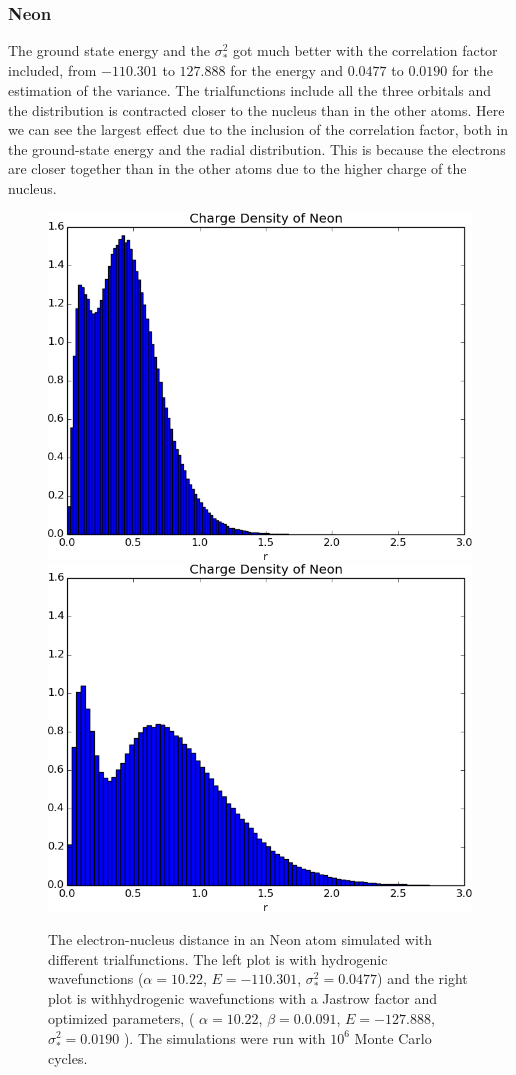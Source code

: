		
	\subsubsection{Neon}
		The ground state energy and the \(\sigma_*^2\) got much better with the correlation factor included, from \(-110.301\) to \(127.888\) for the energy and  \( 0.0477 \) to \( 0.0190 \) for the estimation of the variance. The trialfunctions include all the three orbitals and the distribution is contracted closer to the nucleus than in the other atoms. Here we can see the largest effect due to the inclusion of the correlation factor, both in the ground-state energy and the radial distribution. This is because the electrons are closer together than in the other atoms due to the higher charge of the nucleus.
		\begin{figure}
			\centering \includegraphics[width=0.45\linewidth]{../figures/used/ChargeDensityNeonSimple}
			\centering \includegraphics[width=0.45\linewidth]{../figures/used/ChargeDensityNeon}
			\protect\caption{The electron-nucleus distance in an Neon atom simulated with different trialfunctions. The left plot is with hydrogenic wavefunctions ($\alpha = 10.22$, $E = -110.301$, $\sigma^2_* = 0.0477$) and the right plot is withhydrogenic wavefunctions with a Jastrow factor and optimized parameters, ( $\alpha = 10.22$, $\beta = 0.0.091$,  $E = -127.888$, $\sigma^2_* = 0.0190$ ). The simulations were run with \(10^6\) Monte Carlo cycles.}
			\label{fig:chargeDensityNeon}
		\end{figure}